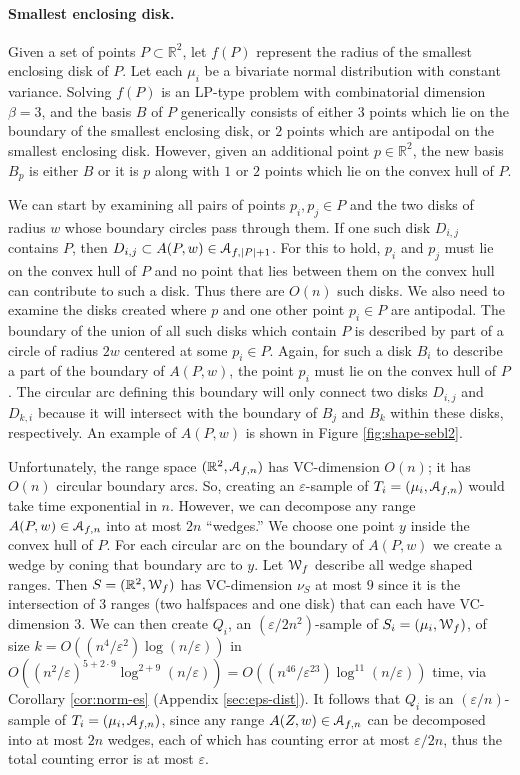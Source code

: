 \documentclass{journal}
\newcommand{\eps}{\varepsilon}
\newcommand{\Eu}[1]{\ensuremath{\EuScript{#1}}}
\newcommand{\R}{\ensuremath{\mathbb{R}}}
\begin{document}
\paragraph{Smallest enclosing disk.}
Given a set of points $P \subset \R^2$, let $f(P)$ represent the radius of the smallest enclosing disk of $P$.  Let each $\mu_i$ be a bivariate normal distribution with constant variance.  Solving $f(P)$ is an LP-type problem with combinatorial dimension $\beta = 3$, and the basis $B$ of $P$ generically consists of either $3$ points which lie on the boundary of the smallest enclosing disk, or $2$ points which are antipodal on the smallest enclosing disk.  However, given an additional point $p \in \R^2$, the new basis $B_p$ is either $B$ or it is $p$ along with $1$ or $2$ points which lie on the convex hull of $P$.

We can start by examining all pairs of points $p_i, p_j \in P$ and the two disks of radius $w$ whose boundary circles pass through them.  If one such disk $D_{i,j}$ contains $P$, then $D_{i,j} \subset A(P, w) \in \Eu A_{f, |P|+1}$.  For this to hold, $p_i$ and $p_j$ must lie on the convex hull of $P$ and no point that lies between them on the convex hull can contribute to such a disk.  Thus there are $O(n)$ such disks.
We also need to examine the disks created where $p$ and one other point $p_i \in P$ are antipodal.  The boundary of the union of all such disks which contain $P$ is described by part of a circle of radius $2w$ centered at some $p_i \in P$.  Again, for such a disk $B_i$ to describe a part of the boundary of $A(P,w)$, the point $p_i$ must lie on the convex hull of $P$.  The circular arc defining this boundary will only connect two disks $D_{i,j}$ and $D_{k,i}$ because it will intersect with the boundary of $B_j$ and $B_k$ within these disks, respectively.  An example of $A(P,w)$ is shown in Figure \ref{fig:shape-sebl2}.

Unfortunately, the range space $(\R^2, \Eu A_{f,n})$ has VC-dimension $O(n)$; it has $O(n)$ circular boundary arcs.  So, creating an $\eps$-sample of $T_i = (\mu_i, \Eu A_{f,n})$ would take time exponential in $n$.  However, we can decompose any range $A(P, w) \in \Eu A_{f,n}$ into at most $2n$ ``wedges.''  We choose one point $y$ inside the convex hull of $P$.  For each circular arc on the boundary of $A(P, w)$ we create a wedge by coning that boundary arc to $y$.  Let $\Eu W_f$ describe all wedge shaped ranges.  Then $S = (\R^2, \Eu W_f)$ has VC-dimension $\nu_S$ at most $9$ since it is the intersection of $3$ ranges (two halfspaces and one disk) that can each have VC-dimension $3$.
We can then create $Q_i$, an $(\eps/2n^2)$-sample of $S_i = (\mu_i, \Eu W_f)$, of size $k = O((n^4/\eps^2) \log (n/\eps))$ in $O((n^2/\eps)^{5+2\cdot9} \log^{2+9} (n/\eps)) = O((n^{46}/\eps^{23}) \log^{11}(n/\eps))$ time, via Corollary \ref{cor:norm-es} (Appendix \ref{sec:eps-dist}).
It follows that $Q_i$ is an $(\eps/n)$-sample of $T_i = (\mu_i, \Eu A_{f,n})$, since any range $A(Z,w) \in \Eu A_{f,n}$ can be decomposed into at most $2n$ wedges, each of which has counting error at most $\eps/2n$, thus the total counting error is at most $\eps$.
\end{document}
